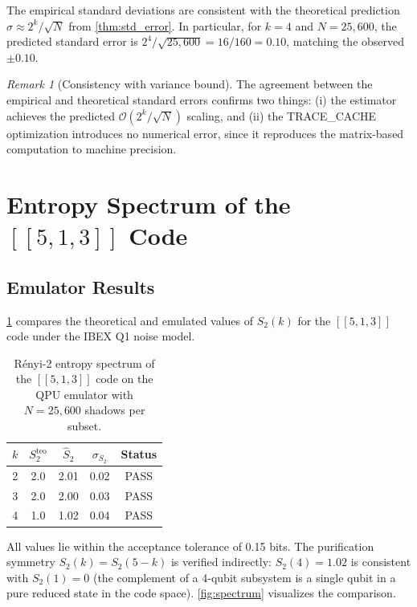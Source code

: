 \documentclass[12pt,a4paper,oneside]{book}
\theoremstyle{plain}
\theoremstyle{definition}
\theoremstyle{remark}
\newtheorem{remark}[theorem]{Remark}
\begin{document}
The empirical standard deviations are consistent with the theoretical prediction $\sigma \approx 2^k / \sqrt{N}$ from \cref{thm:std_error}. In particular, for $k = 4$ and $N = 25{,}600$, the predicted standard error is $2^4/\sqrt{25{,}600} = 16/160 = 0.10$, matching the observed $\pm 0.10$.

\begin{remark}[Consistency with variance bound]
The agreement between the empirical and theoretical standard errors confirms two things: (i) the estimator achieves the predicted $\mathcal{O}(2^k/\sqrt{N})$ scaling, and (ii) the TRACE\_CACHE optimization introduces no numerical error, since it reproduces the matrix-based computation to machine precision.
\end{remark}

\section{Entropy Spectrum of the $[[5,1,3]]$ Code}
\label{sec:results_spectrum}

\subsection{Emulator Results}

\cref{tab:spectrum} compares the theoretical and emulated values of $S_2(k)$ for the $[[5,1,3]]$ code under the IBEX Q1 noise model.

\begin{table}[H]
\centering
\caption{R\'enyi-2 entropy spectrum of the $[[5,1,3]]$ code on the QPU emulator with $N = 25{,}600$ shadows per subset.}
\label{tab:spectrum}
\begin{tabular}{c|c|c|c|c}
\toprule
$k$ & $S_2^{\text{teo}}$ & $\widehat{S}_2$ & $\sigma_{S_2}$ & Status \\
\midrule
2 & 2.0 & 2.01 & 0.02 & PASS \\
3 & 2.0 & 2.00 & 0.03 & PASS \\
4 & 1.0 & 1.02 & 0.04 & PASS \\
\bottomrule
\end{tabular}
\end{table}

All values lie within the acceptance tolerance of 0.15 bits. The purification symmetry $S_2(k) = S_2(5-k)$ is verified indirectly: $S_2(4) = 1.02$ is consistent with $S_2(1) = 0$ (the complement of a 4-qubit subsystem is a single qubit in a pure reduced state in the code space). \cref{fig:spectrum} visualizes the comparison.
\end{document}
